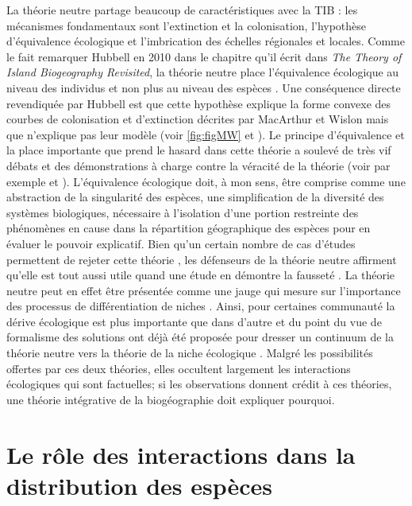 La théorie neutre partage beaucoup de caractéristiques avec la TIB : les
mécanismes fondamentaux sont l'extinction et la colonisation,
l'hypothèse d'équivalence écologique et l'imbrication des échelles
régionales et locales. Comme le fait remarquer Hubbell en 2010 dans le
chapitre qu'il écrit dans \emph{The Theory of Island Biogeography
Revisited}, la théorie neutre place l'équivalence écologique au niveau
des individus et non plus au niveau des espèces \citep{Hubbell2010}. Une
conséquence directe revendiquée par Hubbell est que cette hypothèse
explique la forme convexe des courbes de colonisation et d'extinction
décrites par MacArthur et Wislon mais que n'explique pas leur modèle
(voir \ref{fig:figMW} et \citet{Hubbell2010}). Le principe d'équivalence
et la place importante que prend le hasard dans cette théorie a soulevé
de très vif débats et des démonstrations à charge contre la véracité de
la théorie (voir par exemple \citet{McGill2003} et
\citet{Ricklefs2003}). L'équivalence écologique doit, à mon sens, être
comprise comme une abstraction de la singularité des espèces, une
simplification de la diversité des systèmes biologiques, nécessaire à
l'isolation d'une portion restreinte des phénomènes en cause dans la
répartition géographique des espèces pour en évaluer le pouvoir
explicatif. Bien qu'un certain nombre de cas d'études permettent de
rejeter cette théorie \citep{McGill2003, John2007}, les défenseurs de la
théorie neutre affirment qu'elle est tout aussi utile quand une étude en
démontre la fausseté \citep{Rosindell2012}. La théorie neutre peut en
effet être présentée comme une jauge qui mesure sur l'importance des
processus de différentiation de niches \citep{Wennekes2012}. Ainsi, pour
certaines communauté la dérive écologique est plus importante que dans
d'autre et du point du vue de formalisme des solutions ont déjà été
proposée pour dresser un continuum de la théorie neutre vers la théorie
de la niche écologique \citep{Gravel2006a}. Malgré les possibilités
offertes par ces deux théories, elles occultent largement les
interactions écologiques qui sont factuelles; si les observations
donnent crédit à ces théories, une théorie intégrative de la
biogéographie doit expliquer pourquoi.

\section*{Le rôle des interactions dans la distribution des
espèces}\label{le-ruxf4le-des-interactions-dans-la-distribution-des-espuxe8ces}

